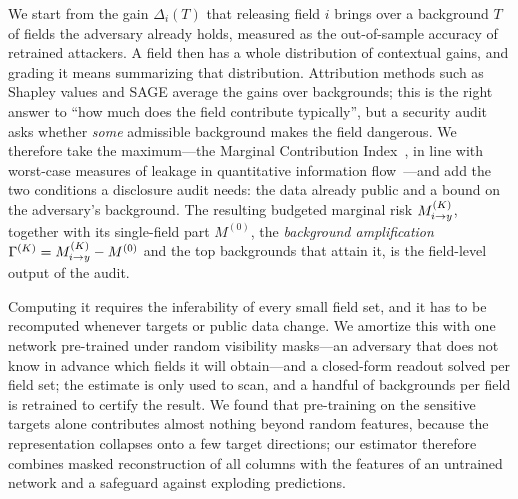 We start from the gain $\Delta_i(T)$ that releasing field $i$ brings over a background $T$ of fields
the adversary already holds, measured as the out-of-sample accuracy of retrained attackers. A field
then has a whole distribution of contextual gains, and grading it means summarizing that
distribution. Attribution methods such as Shapley values and SAGE average the gains over backgrounds;
this is the right answer to ``how much does the field contribute typically'', but a security audit
asks whether \emph{some} admissible background makes the field dangerous. We therefore take the
maximum---the Marginal Contribution Index~\cite{catav2021mci}, in line with worst-case measures of
leakage in quantitative information flow~\cite{smith2009qif,alvim2012gleakage}---and add the two
conditions a disclosure audit needs: the data already public and a bound on the adversary's
background. The resulting budgeted marginal risk $M^{(K)}_{i \to y}$, together with its single-field part
$M^{(0)}$, the \emph{background amplification} $\Gamma^{(K)}=M^{(K)}_{i \to y}-M^{(0)}$ and the top backgrounds
that attain it, is the field-level output of the audit.

Computing it requires the inferability of every small field set, and it has to be recomputed
whenever targets or public data change. We amortize this with one network pre-trained under random
visibility masks---an adversary that does not know in advance which fields it will obtain---and a
closed-form readout solved per field set; the estimate is only used to scan, and a handful of
backgrounds per field is retrained to certify the result. We found that pre-training on the
sensitive targets alone contributes almost nothing beyond random features, because the representation
collapses onto a few target directions; our estimator therefore combines masked reconstruction of all columns with the
features of an untrained network and a safeguard against exploding predictions.

